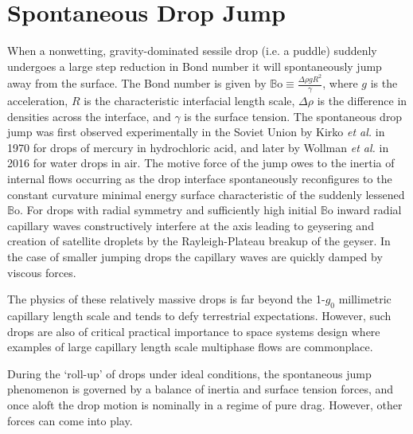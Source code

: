 \documentclass[aip,reprint, floatfix]{revtex4-1}
\begin{document}
\pacs{}%

\maketitle %

\section{Spontaneous Drop Jump}
When a nonwetting, gravity-dominated sessile drop (i.e. a puddle) suddenly undergoes a large step reduction in Bond number it will spontaneously jump away from the surface. The Bond number is given by $\mathbb{B}\mbox{o} \equiv \frac{\Delta \rho g R^2}{\gamma}$, where $g$ is the acceleration, $R$ is the characteristic interfacial length scale, $\Delta \rho$ is the difference in densities across the interface, and $\gamma$ is the surface tension. The spontaneous drop jump was first observed experimentally in the Soviet Union by Kirko \emph{et al.} \cite{kirko_phenomenon_1970} in 1970 for drops of mercury in hydrochloric acid, and later by Wollman \emph{et al.} \cite{wollman_more_2016} in 2016 for water drops in air. The motive force of the jump owes to the inertia of internal flows occurring as the drop interface spontaneously reconfigures to the constant curvature minimal energy surface characteristic of the suddenly lessened $\mathbb{B}\mbox{o}$. For drops with radial symmetry and sufficiently high initial $\mathbb{B}\mbox{o}$ inward radial capillary waves constructively interfere at the axis leading to geysering and creation of satellite droplets by the Rayleigh-Plateau breakup of the geyser. In the case of smaller jumping drops the capillary waves are quickly damped by viscous forces.

The physics of these relatively massive drops is far beyond the 1-$g_0$ millimetric capillary length scale and tends to defy terrestrial expectations. However, such drops are also of critical practical importance to space systems design where examples of large capillary length scale multiphase flows are commonplace.

During the `roll-up' of drops under ideal conditions, the spontaneous jump phenomenon is governed by a balance of inertia and surface tension forces, and once aloft the drop motion is nominally in a regime of pure drag. However, other forces can come into play. 
\end{document}
